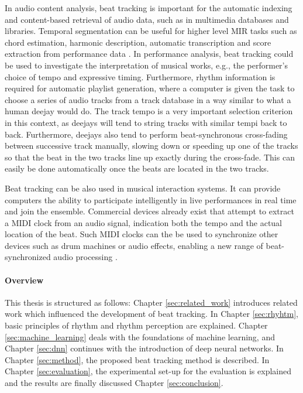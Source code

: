 \documentclass{scrartcl}
\begin{document}

In audio content analysis, beat tracking is important for the automatic indexing and content-based retrieval of audio data, such as in multimedia databases and libraries. Temporal segmentation can be useful for higher level MIR tasks such as chord estimation, harmonic description, automatic transcription and score extraction from performance data \cite{Bello2005b}. In performance analysis, beat tracking could be used to investigate the interpretation of musical works, e.g., the performer's choice of tempo and expressive timing. Furthermore, rhythm information is required for automatic playlist generation, where a computer is given the task to choose a series of audio tracks from a track database in a way similar to what a human deejay would do. The track tempo is a very important selection criterion in this context, as deejays will tend to string tracks with similar tempi back to back. Furthermore, deejays also tend to perform beat-synchronous cross-fading between successive track manually, slowing down or speeding up one of the tracks so that the beat in the two tracks line up exactly during the cross-fade. This can easily be done automatically once the beats are located in the two tracks.


Beat tracking can be also used in musical interaction systems. It can provide computers the ability to participate intelligently in live performances in real time and join the ensemble. Commercial devices already exist that attempt to extract a MIDI clock from an audio signal, indication both the tempo and the actual location of the beat. Such MIDI clocks can the be used to synchronize other devices such as drum machines or audio effects, enabling a new range of beat-synchronized audio processing \cite{Robertson2007}. 


\paragraph{Overview} This thesis is structured as follows: Chapter \ref{sec:related_work} introduces related work which influenced the development of beat tracking. In Chapter \ref{sec:rhyhtm}, basic principles of rhythm and rhythm perception are explained. Chapter \ref{sec:machine_learning} deals with the foundations of machine learning, and Chapter \ref{sec:dnn} continues with the introduction of deep neural networks. In Chapter \ref{sec:method}, the proposed beat tracking method is described. In Chapter \ref{sec:evaluation}, the experimental set-up for the evaluation is explained and the results are finally discussed Chapter \ref{sec:conclusion}. 
\end{document}
